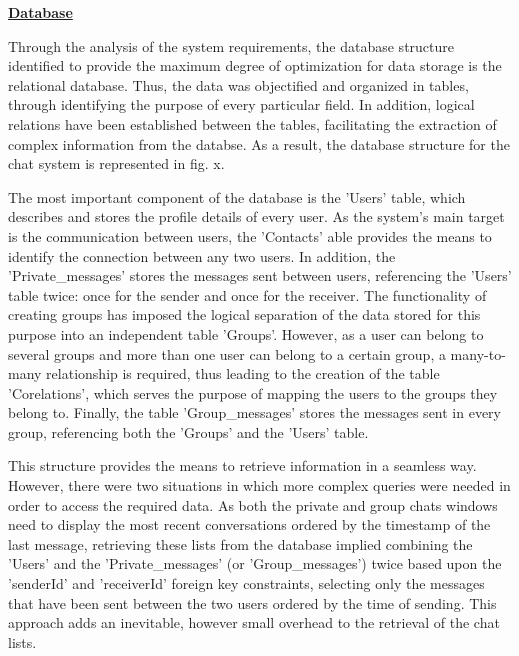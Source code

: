 \documentclass{article}
\begin{document}
\begin{enumerate}
		\underline{\textbf{Database}}
	
	Through the analysis of the system requirements, the database structure identified to provide the maximum degree of optimization for data storage is the relational database. Thus, the data was objectified and organized in tables, through identifying the purpose of every particular field. In addition, logical relations have been established between the tables, facilitating the extraction of complex information from the databse. As a result, the database structure for the chat system is represented in fig. x.\par
	
	The most important component of the database is the 'Users' table, which describes and stores the profile details of every user. As the system's main target is the communication between users, the 'Contacts' able provides the means to identify the connection between any two users. In addition, the 'Private\_messages' stores the messages sent between users, referencing the 'Users' table twice: once for the sender and once for the receiver. The functionality of creating groups has imposed the logical separation of the data stored for this purpose into an independent table 'Groups'. However, as a user can belong to several groups and more than one user can belong to a certain group, a many-to-many relationship is required, thus leading to the creation of the table 'Corelations', which serves the purpose of mapping the users to the groups they belong to. Finally, the table 'Group\_messages' stores the messages sent in every group, referencing both the 'Groups' and the 'Users' table.
	
	This structure provides the means to retrieve information in a seamless way. However, there were two situations in which more complex queries were needed in order to access the required data. As both the private and group chats windows need to display the most recent conversations ordered by the timestamp of the last message, retrieving these lists from the database implied combining the 'Users' and the 'Private\_messages' (or 'Group\_messages') twice based upon the 'senderId' and 'receiverId' foreign key constraints, selecting only the messages that have been sent between the two users ordered by the time of sending. This approach adds an inevitable, however small overhead to the retrieval of the chat lists.


\end{enumerate}
\end{document}
